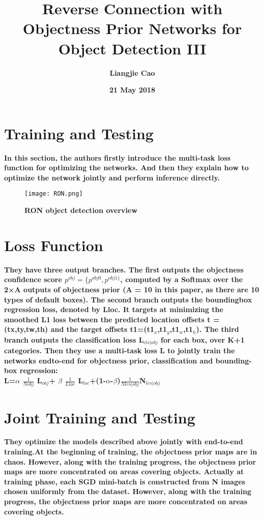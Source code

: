 \documentclass[40pt]{article}
\begin{document}
\title{\textbf{Reverse Connection with Objectness Prior Networks for Object Detection III}}
\author{\textbf{Liangjie Cao}}
\date{\textbf{21 May 2018}}
\maketitle
\par
\setlength{\baselineskip}{15pt}
\section{Training and Testing}
\textbf{In this section, the authors ﬁrstly introduce the multi-task loss function for optimizing the networks. And then they explain how to optimize the network jointly and perform inference directly. }
\begin{figure}[htbp]
 \centering
 \texttt{[image: RON.png]}\\
 \caption{\textbf{RON object detection overview}}\label{Figure1}
 \end{figure}
\par
\section{Loss Function}
\textbf{They have three output branches. The ﬁrst outputs the objectness conﬁdence score $p ^{obj} = \{p ^{obj0}, p^{obj1\} }$, computed by a Softmax over the 2×A outputs of objectness prior (A = 10 in this paper, as there are 10 types of default boxes). The second branch outputs the boundingbox regression loss, denoted by Lloc. It targets at minimizing the smoothed L1 loss\cite{name1} between the predicted location offsets t = (tx,ty,tw,th) and the target offsets t1=(t1$_x$,t1$_y$,t1$_w$,t1$_h$). The third branch outputs the classiﬁcation loss L$_{cls|obj}$ for each box, over K+1 categories. Then they use a multi-task loss L to jointly train the networks endto-end for objectness prior, classiﬁcation and bounding-box regression:\\
 {\centering L=$\alpha$ $\frac{1}{N{obj}}$ L${_{obj}}$+ $\beta$ $\frac{1}{L{loc}}$ L${_{loc}}$+(1-$\alpha$-$\beta$)$\frac{1}{Nlcs|obj}$N${_{lcs|obj}}$ }
}
\par
\section{Joint Training and Testing}
\textbf{They optimize the models described above jointly with end-to-end training.At the beginning of training, the objectness prior maps are in chaos. However, along with the training progress, the objectness prior maps are more concentrated on areas covering objects.\cite{name2} Actually at training phase, each SGD mini-batch is constructed from N images chosen uniformly from the dataset. However, along with the training progress, the objectness prior maps are more concentrated on areas covering objects.
}\\
\end{document}
